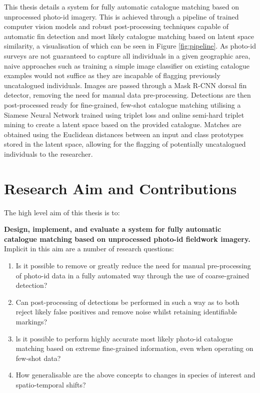 This thesis details a system for fully automatic catalogue matching based on unprocessed photo-id imagery. This is achieved through a pipeline of trained computer vision models and robust post-processing techniques capable of automatic fin detection and most likely catalogue matching based on latent space similarity, a visualisation of which can be seen in Figure \ref{fig:pipeline}. As photo-id surveys are not guaranteed to capture all individuals in a given geographic area, naive approaches such as training a simple image classifier on existing catalogue examples would not suffice as they are incapable of flagging previously uncatalogued individuals. Images are passed through a Mask R-CNN \cite{he_mask_2017} dorsal fin detector, removing the need for manual data pre-processing. Detections are then post-processed ready for fine-grained, few-shot catalogue matching utilising a Siamese Neural Network trained using triplet loss \cite{schroff_facenet_2015} and online semi-hard triplet mining to create a latent space based on the provided catalogue. Matches are obtained using the Euclidean distances between an input and class prototypes stored in the latent space, allowing for the flagging of potentially uncatalogued individuals to the researcher.

\section{Research Aim and Contributions}\label{ch:intro,sec:AimsAndContributions}

The high level aim of this thesis is to:

\begin{flushleft}
	\textbf{Design, implement, and evaluate a system for fully automatic catalogue matching based on unprocessed photo-id fieldwork imagery.}
	\bigbreak\noindent Implicit in this aim are a number of research questions:
\end{flushleft}

\begin{enumerate}
	\item Is it possible to remove or greatly reduce the need for manual pre-processing of photo-id data in a fully automated way through the use of coarse-grained detection?
	\item Can post-processing of detections be performed in such a way as to both reject likely false positives and remove noise whilst retaining identifiable markings?
	\item ls it possible to perform highly accurate most likely photo-id catalogue matching based on extreme fine-grained information, even when operating on few-shot data?
	\item How generalisable are the above concepts to changes in species of interest and spatio-temporal shifts?
\end{enumerate}

